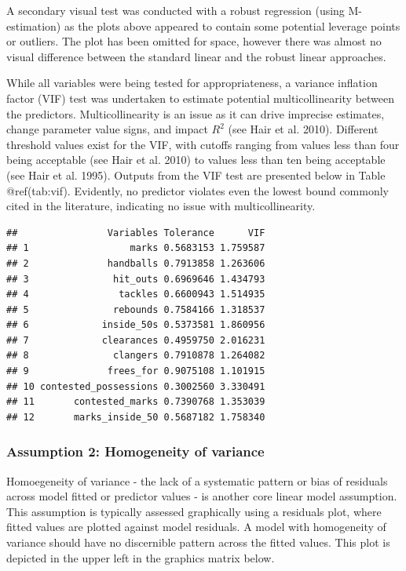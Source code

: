 \documentclass{article}
\begin{document}
A secondary visual test was conducted with a robust regression (using
M-estimation) as the plots above appeared to contain some potential
leverage points or outliers. The plot has been omitted for space,
however there was almost no visual difference between the standard
linear and the robust linear approaches.

While all variables were being tested for appropriateness, a variance
inflation factor (VIF) test was undertaken to estimate potential
multicollinearity between the predictors. Multicollinearity is an issue
as it can drive imprecise estimates, change parameter value signs, and
impact \(R^2\) (see Hair et al. 2010). Different threshold values exist
for the VIF, with cutoffs ranging from values less than four being
acceptable (see Hair et al. 2010) to values less than ten being
acceptable (see Hair et al. 1995). Outputs from the VIF test are
presented below in Table @ref(tab:vif). Evidently, no predictor violates
even the lowest bound commonly cited in the literature, indicating no
issue with multicollinearity.

\begin{verbatim}
##                Variables Tolerance      VIF
## 1                  marks 0.5683153 1.759587
## 2              handballs 0.7913858 1.263606
## 3               hit_outs 0.6969646 1.434793
## 4                tackles 0.6600943 1.514935
## 5               rebounds 0.7584166 1.318537
## 6             inside_50s 0.5373581 1.860956
## 7             clearances 0.4959750 2.016231
## 8               clangers 0.7910878 1.264082
## 9              frees_for 0.9075108 1.101915
## 10 contested_possessions 0.3002560 3.330491
## 11       contested_marks 0.7390768 1.353039
## 12       marks_inside_50 0.5687182 1.758340
\end{verbatim}

\hypertarget{assumption-2-homogeneity-of-variance}{%
\subsubsection{Assumption 2: Homogeneity of
variance}\label{assumption-2-homogeneity-of-variance}}

Homoegeneity of variance - the lack of a systematic pattern or bias of
residuals across model fitted or predictor values - is another core
linear model assumption. This assumption is typically assessed
graphically using a residuals plot, where fitted values are plotted
against model residuals. A model with homogeneity of variance should
have no discernible pattern across the fitted values. This plot is
depicted in the upper left in the graphics matrix below.
\end{document}
